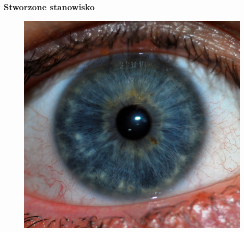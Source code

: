 \documentclass{beamer}
\begin{document}

\begin{frame}
\frametitle{Stworzone stanowisko}
\begin{figure}
\begin{center}
\includegraphics[scale=0.04]{stanowisko.jpg}
\end{center}
\end{figure}
\end{frame}

\end{document}
